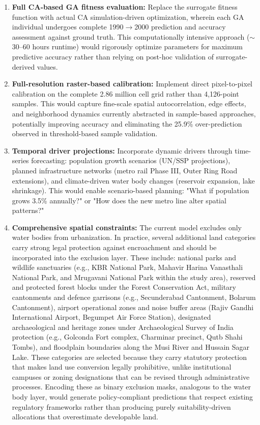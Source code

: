 \documentclass[12pt,a4paper]{article}
\begin{document}
\begin{enumerate}
\item \textbf{Full CA-based GA fitness evaluation:} Replace the surrogate fitness function with actual CA simulation-driven optimization, wherein each GA individual undergoes complete 1990$\rightarrow$2000 prediction and accuracy assessment against ground truth. This computationally intensive approach ($\sim$30--60 hours runtime) would rigorously optimize parameters for maximum predictive accuracy rather than relying on post-hoc validation of surrogate-derived values.

\item \textbf{Full-resolution raster-based calibration:} Implement direct pixel-to-pixel calibration on the complete 2.86 million cell grid rather than 4,126-point samples. This would capture fine-scale spatial autocorrelation, edge effects, and neighborhood dynamics currently abstracted in sample-based approaches, potentially improving accuracy and eliminating the 25.9\% over-prediction observed in threshold-based sample validation.

\item \textbf{Temporal driver projections:} Incorporate dynamic drivers through time-series forecasting: population growth scenarios (UN/SSP projections), planned infrastructure networks (metro rail Phase III, Outer Ring Road extensions), and climate-driven water body changes (reservoir expansion, lake shrinkage). This would enable scenario-based planning: "What if population grows 3.5\% annually?" or "How does the new metro line alter spatial patterns?"

\item \textbf{Comprehensive spatial constraints:} The current model excludes only water bodies from urbanization. In practice, several additional land categories carry strong legal protection against encroachment and should be incorporated into the exclusion layer. These include: national parks and wildlife sanctuaries (e.g., KBR National Park, Mahavir Harina Vanasthali National Park, and Mrugavani National Park within the study area), reserved and protected forest blocks under the Forest Conservation Act, military cantonments and defence garrisons (e.g., Secunderabad Cantonment, Bolarum Cantonment), airport operational zones and noise buffer areas (Rajiv Gandhi International Airport, Begumpet Air Force Station), designated archaeological and heritage zones under Archaeological Survey of India protection (e.g., Golconda Fort complex, Charminar precinct, Qutb Shahi Tombs), and floodplain boundaries along the Musi River and Hussain Sagar Lake. These categories are selected because they carry statutory protection that makes land use conversion legally prohibitive, unlike institutional campuses or zoning designations that can be revised through administrative processes. Encoding these as binary exclusion masks, analogous to the water body layer, would generate policy-compliant predictions that respect existing regulatory frameworks rather than producing purely suitability-driven allocations that overestimate developable land.


\end{enumerate}
\end{document}
